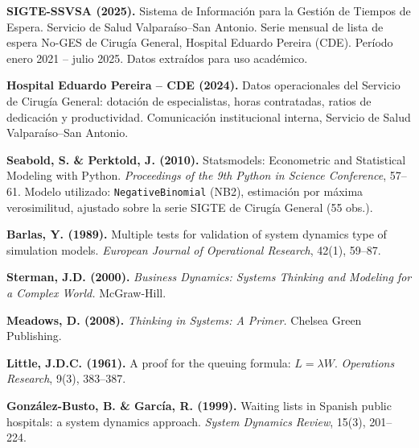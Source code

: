 \documentclass[12pt,a4paper]{article}
\begin{document}
\begin{enumerate}[leftmargin=1.5cm,label=\textbf{[\arabic*]}]

  \item \label{ref:sigte} \textbf{SIGTE-SSVSA (2025).} Sistema de Información para la Gestión
        de Tiempos de Espera. Servicio de Salud Valparaíso--San Antonio. Serie mensual de
        lista de espera No-GES de Cirugía General, Hospital Eduardo Pereira (CDE). Período
        enero 2021 -- julio 2025. Datos extraídos para uso académico.

  \item \label{ref:cde} \textbf{Hospital Eduardo Pereira -- CDE (2024).} Datos operacionales
        del Servicio de Cirugía General: dotación de especialistas, horas contratadas, ratios
        de dedicación y productividad. Comunicación institucional interna, Servicio de Salud
        Valparaíso--San Antonio.

  \item \label{ref:nb} \textbf{Seabold, S. \& Perktold, J. (2010).} Statsmodels: Econometric
        and Statistical Modeling with Python. \textit{Proceedings of the 9th Python in Science
          Conference}, 57--61. Modelo utilizado: \texttt{NegativeBinomial} (NB2), estimación por
        máxima verosimilitud, ajustado sobre la serie SIGTE de Cirugía General (55 obs.).

  \item \label{ref:barlas} \textbf{Barlas, Y. (1989).} Multiple tests for validation of system dynamics type of
        simulation models. \textit{European Journal of Operational Research}, 42(1), 59--87.

  \item \label{ref:sterman} \textbf{Sterman, J.D. (2000).} \textit{Business Dynamics: Systems Thinking and Modeling
          for a Complex World.} McGraw-Hill.

  \item \label{ref:meadows} \textbf{Meadows, D. (2008).} \textit{Thinking in Systems: A Primer.} Chelsea Green
        Publishing.

  \item \label{ref:little} \textbf{Little, J.D.C. (1961).} A proof for the queuing formula: $L=\lambda W$.
        \textit{Operations Research}, 9(3), 383--387.

  \item \label{ref:gonzalez} \textbf{González-Busto, B. \& García, R. (1999).} Waiting lists in Spanish public
        hospitals: a system dynamics approach. \textit{System Dynamics Review}, 15(3), 201--224.


\end{enumerate}
\end{document}
